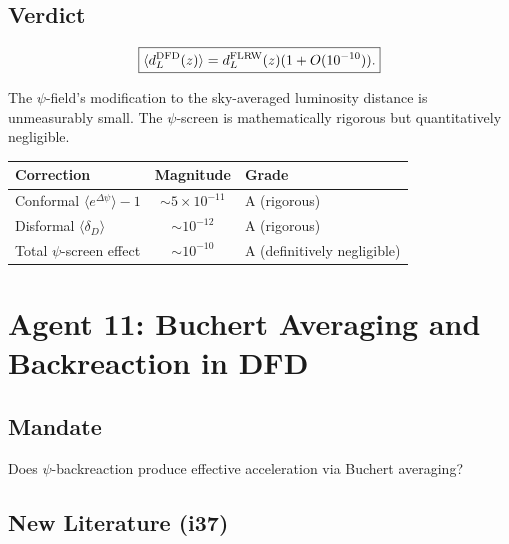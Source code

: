 \documentclass[11pt,a4paper]{article}
\begin{document}
\subsection{Verdict}

\begin{equation}
\boxed{\langle d_L^{\rm DFD}(z)\rangle = d_L^{\rm FLRW}(z)(1 + O(10^{-10})).}
\end{equation}

The $\psi$-field's modification to the sky-averaged luminosity distance is unmeasurably small. The $\psi$-screen is mathematically rigorous but quantitatively negligible.

\begin{center}
\begin{tabular}{lcl}
\toprule
\textbf{Correction} & \textbf{Magnitude} & \textbf{Grade} \\
\midrule
Conformal $\langle e^{\Delta\psi}\rangle - 1$ & $\sim 5\times 10^{-11}$ & A (rigorous) \\
Disformal $\langle\delta_D\rangle$ & $\sim 10^{-12}$ & A (rigorous) \\
Total $\psi$-screen effect & $\sim 10^{-10}$ & A (definitively negligible) \\
\bottomrule
\end{tabular}
\end{center}

\newpage
\section{Agent 11: Buchert Averaging and Backreaction in DFD}
\label{sec:agent11}

\subsection{Mandate}

Does $\psi$-backreaction produce effective acceleration via Buchert averaging?

\subsection{New Literature (i37)}
\end{document}
